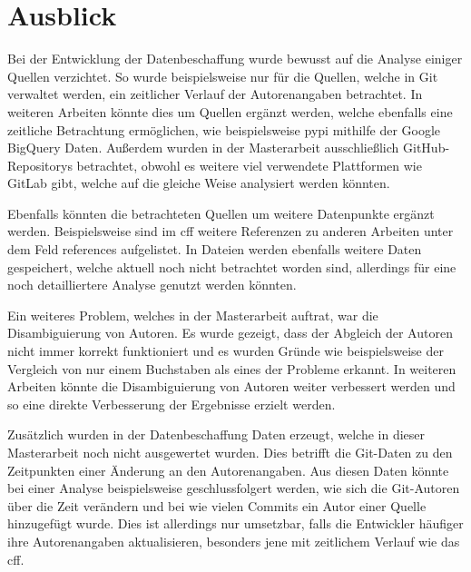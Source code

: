 \section{Ausblick}
\label{sec:ausblick}
Bei der Entwicklung der Datenbeschaffung wurde bewusst auf die Analyse einiger Quellen verzichtet.
So wurde beispielsweise nur für die Quellen, welche in Git verwaltet werden, ein zeitlicher Verlauf der Autorenangaben betrachtet.
In weiteren Arbeiten könnte dies um Quellen ergänzt werden, welche ebenfalls eine zeitliche Betrachtung ermöglichen, wie beispielsweise \gls{pypi} mithilfe der Google BigQuery Daten.
Außerdem wurden in der Masterarbeit ausschließlich GitHub-Repositorys betrachtet, obwohl es weitere viel verwendete Plattformen wie GitLab gibt, welche auf die gleiche Weise analysiert werden könnten.

Ebenfalls könnten die betrachteten Quellen um weitere Datenpunkte ergänzt werden.
Beispielsweise sind im \gls{cff} weitere Referenzen zu anderen Arbeiten unter dem Feld \glqq references\grqq{} aufgelistet.
In  Dateien werden ebenfalls weitere Daten gespeichert, welche aktuell noch nicht betrachtet worden sind, allerdings für eine noch detailliertere Analyse genutzt werden könnten.

Ein weiteres Problem, welches in der Masterarbeit auftrat, war die Disambiguierung von Autoren.
Es wurde gezeigt, dass der Abgleich der Autoren nicht immer korrekt funktioniert und es wurden Gründe wie beispielsweise der Vergleich von nur einem Buchstaben als eines der Probleme erkannt.
In weiteren Arbeiten könnte die Disambiguierung von Autoren weiter verbessert werden und so eine direkte Verbesserung der Ergebnisse erzielt werden.

Zusätzlich wurden in der Datenbeschaffung Daten erzeugt, welche in dieser Masterarbeit noch nicht ausgewertet wurden.
Dies betrifft die Git-Daten zu den Zeitpunkten einer Änderung an den Autorenangaben.
Aus diesen Daten könnte bei einer Analyse beispielsweise geschlussfolgert werden, wie sich die Git-Autoren über die Zeit verändern und bei wie vielen Commits ein Autor einer Quelle hinzugefügt wurde.
Dies ist allerdings nur umsetzbar, falls die Entwickler häufiger ihre Autorenangaben aktualisieren, besonders jene mit zeitlichem Verlauf wie das \gls{cff}.
